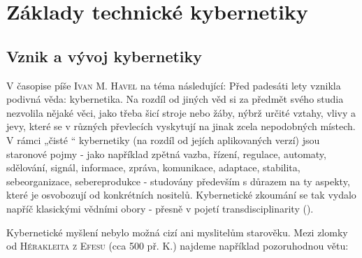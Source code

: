 \setchaptertoc
\chapter{Základy technické kybernetiky}\label{tky:IchapI}
  \section{Vznik a vývoj kybernetiky}\label{tky:IchapIsecI}
    V časopise \casopisVesmir píše \textsc{Ivan M. Havel} na téma  následující: Před
    padesáti lety vznikla podivná věda: kybernetika. Na rozdíl od jiných věd si za předmět svého
    studia nezvolila nějaké věci, jako třeba šicí stroje nebo žáby, nýbrž určité vztahy, vlivy a
    jevy, které se v různých převlecích vyskytují na jinak zcela nepodobných místech. V rámci „čisté
    “ kybernetiky (na rozdíl od jejích aplikovaných verzí) jsou staronové pojmy - jako například
    zpětná vazba, řízení, regulace, automaty, sdělování, signál, informace, zpráva, komunikace,
    adaptace, stabilita, sebeorganizace, sebereprodukce - studovány především s důrazem na ty
    aspekty, které je osvobozují od konkrétních nositelů. Kybernetické zkoumání se tak vydalo napříč
    klasickými vědními obory - přesně v pojetí transdisciplinarity (\cite{Vesmir1998_11}).

    Kybernetické myšlení nebylo možná cizí ani myslitelům starověku. Mezi zlomky od
    \textsc{Hérakleita z Efesu} (cca 500 př. K.) najdeme například pozoruhodnou větu:
    \begin{center}
    \end{center}  


